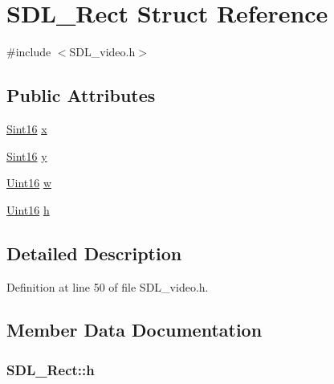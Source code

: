 \hypertarget{struct_s_d_l___rect}{}\section{S\+D\+L\+\_\+\+Rect Struct Reference}
\label{struct_s_d_l___rect}


{\ttfamily \#include $<$S\+D\+L\+\_\+video.\+h$>$}

\subsection*{Public Attributes}
\begin{DoxyCompactItemize}
\item 
\hyperlink{_s_d_l__stdinc_8h_a9d0257032c0e146ab6121bf0122712f5}{Sint16} \hyperlink{struct_s_d_l___rect_a7a358b2006a14a40c0d52e5940d92c23}{x}
\item 
\hyperlink{_s_d_l__stdinc_8h_a9d0257032c0e146ab6121bf0122712f5}{Sint16} \hyperlink{struct_s_d_l___rect_a4d55e2006d059c2060f0a54ce4ce553d}{y}
\item 
\hyperlink{_s_d_l__stdinc_8h_a31fcc0a076c9068668173ee26d33e42b}{Uint16} \hyperlink{struct_s_d_l___rect_a1b56ba7422035ca0dc31f052638a7042}{w}
\item 
\hyperlink{_s_d_l__stdinc_8h_a31fcc0a076c9068668173ee26d33e42b}{Uint16} \hyperlink{struct_s_d_l___rect_a89f7a624cd7d5c901f2c7746d1af26c6}{h}
\end{DoxyCompactItemize}


\subsection{Detailed Description}


Definition at line 50 of file S\+D\+L\+\_\+video.\+h.



\subsection{Member Data Documentation}
\hypertarget{struct_s_d_l___rect_a89f7a624cd7d5c901f2c7746d1af26c6}{}
\subsubsection[{h}]{ S\+D\+L\+\_\+\+Rect\+::h}\label{struct_s_d_l___rect_a89f7a624cd7d5c901f2c7746d1af26c6}


